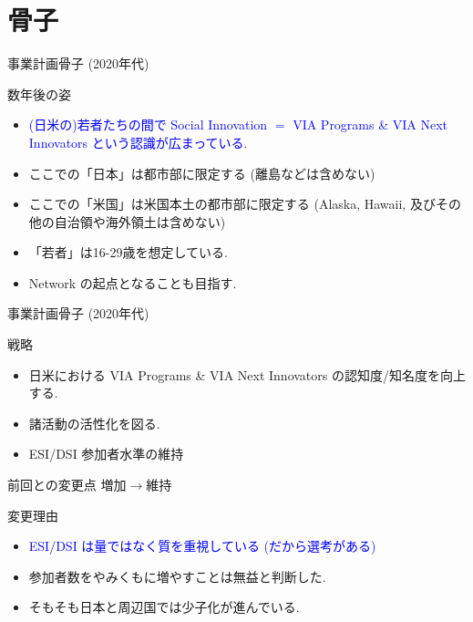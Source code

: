 \documentclass[dvipdfmx,10pt]{beamer}
\newcommand{\bb}{\begin{block}}
\newcommand{\eb}{\end{block}}
\begin{document}
\section{骨子}
\begin{frame}{事業計画骨子 (2020年代)}
\bb{数年後の姿}
\begin{itemize}
\item \textcolor{blue}{(日米の)若者たちの間で Social Innovation $=$ VIA Programs \& VIA Next Innovators という認識が広まっている.}
\item ここでの「日本」は都市部に限定する (離島などは含めない)
\item ここでの「米国」は米国本土の都市部に限定する (Alaska, Hawaii, 及びその他の自治領や海外領土は含めない)
\item 「若者」は16-29歳を想定している.
\item Network の起点となることも目指す.
\end{itemize}
\eb
\end{frame}
\begin{frame}{事業計画骨子 (2020年代)}
\bb{戦略}
\begin{itemize}
\item 日米における VIA Programs \& VIA Next Innovators の認知度/知名度を向上する.
\item 諸活動の活性化を図る.
\item ESI/DSI 参加者水準の維持
\end{itemize}
\eb
\begin{alertblock}{前回との変更点}
増加$\to$維持
\end{alertblock}
\bb{変更理由}
\begin{itemize}
\item \textcolor{blue}{ESI/DSI は量ではなく質を重視している (だから選考がある)}
\item 参加者数をやみくもに増やすことは無益と判断した.
\item そもそも日本と周辺国では少子化が進んでいる.
\end{itemize}
\eb
\end{frame}
\end{document}
